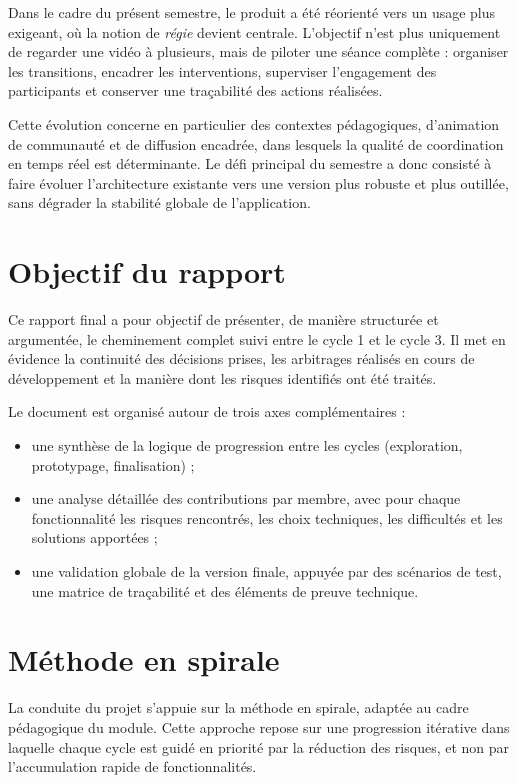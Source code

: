 \documentclass[11pt,a4paper]{report}
\begin{document}
Dans le cadre du présent semestre, le produit a été réorienté vers un usage plus exigeant, où la notion de \textit{régie} devient centrale. L'objectif n'est plus uniquement de regarder une vidéo à plusieurs, mais de piloter une séance complète : organiser les transitions, encadrer les interventions, superviser l'engagement des participants et conserver une traçabilité des actions réalisées.

Cette évolution concerne en particulier des contextes pédagogiques, d'animation de communauté et de diffusion encadrée, dans lesquels la qualité de coordination en temps réel est déterminante. Le défi principal du semestre a donc consisté à faire évoluer l'architecture existante vers une version plus robuste et plus outillée, sans dégrader la stabilité globale de l'application.

\section{Objectif du rapport}
Ce rapport final a pour objectif de présenter, de manière structurée et argumentée, le cheminement complet suivi entre le cycle 1 et le cycle 3. Il met en évidence la continuité des décisions prises, les arbitrages réalisés en cours de développement et la manière dont les risques identifiés ont été traités.

Le document est organisé autour de trois axes complémentaires :
\begin{itemize}
    \item une synthèse de la logique de progression entre les cycles (exploration, prototypage, finalisation) ;
    \item une analyse détaillée des contributions par membre, avec pour chaque fonctionnalité les risques rencontrés, les choix techniques, les difficultés et les solutions apportées ;
    \item une validation globale de la version finale, appuyée par des scénarios de test, une matrice de traçabilité et des éléments de preuve technique.
\end{itemize}

\section{Méthode en spirale}
La conduite du projet s'appuie sur la méthode en spirale, adaptée au cadre pédagogique du module. Cette approche repose sur une progression itérative dans laquelle chaque cycle est guidé en priorité par la réduction des risques, et non par l'accumulation rapide de fonctionnalités.
\end{document}
